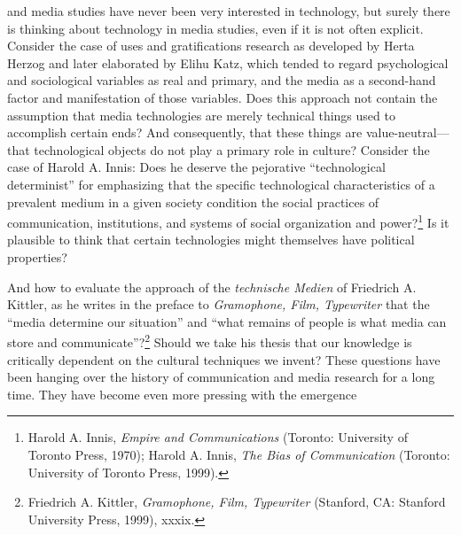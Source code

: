\documentclass{tufte-handout}
\begin{document}
\begin{titlepage}
\begin{fullwidth}
\end{fullwidth}

\vspace*{1em}


 and media studies have never been very
interested in technology, but surely there is thinking about technology
in media studies, even if it is not often explicit. Consider the case of
uses and gratifications research as developed by Herta Herzog and later
elaborated by Elihu Katz, which tended to regard psychological and
sociological variables as real and primary, and the media as a
second-hand factor and manifestation of those variables. Does this
approach not contain the assumption that media technologies are merely
technical things used to accomplish certain ends? And consequently, that
these things are value-neutral---that technological objects do not play
a primary role in culture? Consider the case of Harold A. Innis: Does he
deserve the pejorative ``technological determinist'' for emphasizing
that the specific technological characteristics of a prevalent medium in
a given society condition the social practices of communication,
institutions, and systems of social organization and
power?\footnote{Harold A. Innis, \emph{Empire and Communications} (Toronto: University
  of Toronto Press, 1970); Harold A. Innis, \emph{The Bias of
  Communication} (Toronto: University of Toronto Press, 1999).
} Is it plausible to think
that certain technologies might themselves have political properties?

And how to evaluate the approach of the \emph{technische Medien} of
Friedrich A. Kittler, as he writes in the preface to \emph{Gramophone,
Film, Typewriter} that the ``media determine our situation'' and ``what
remains of people is what media can store and
communicate''?\footnote{Friedrich A. Kittler, \emph{Gramophone, Film, Typewriter} (Stanford,
  CA: Stanford University Press, 1999), xxxix.
} Should we take his
thesis that our knowledge is critically dependent on the cultural
techniques we invent? These questions have been hanging over the history
of communication and media research for a long time. They have become
even more pressing with the emergence 

\enlargethispage{2\baselineskip}

\vspace*{2em}





 \end{titlepage}
\end{document}
